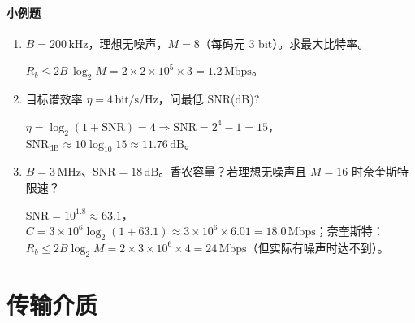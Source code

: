 \documentclass[lang=cn,newtx,10pt,scheme=chinese]{../../elegantbook}
\begin{document}
\paragraph{小例题}
\begin{enumerate}[label=例\arabic*.]
    \item $B=200\,\mathrm{kHz}$，理想无噪声，$M=8$（每码元 3 bit）。求最大比特率。
  
    $R_b\le 2B\,\log_2M=2\times 2\times 10^5\times 3=1.2\,\mathrm{Mbps}$。
  
    \item 目标谱效率 $\eta=4\,\mathrm{bit/s/Hz}$，问最低 SNR(dB)?
  
    $\eta=\log_2(1+\mathrm{SNR})=4\Rightarrow \mathrm{SNR}=2^4-1=15$，$\mathrm{SNR}_{\mathrm{dB}}\approx 10\log_{10}15\approx 11.76\,\mathrm{dB}$。
  
    \item $B=3\,\mathrm{MHz}$、$\mathrm{SNR}=18\,\mathrm{dB}$。香农容量？若理想无噪声且 $M=16$ 时奈奎斯特限速？
  
    $\mathrm{SNR}=10^{1.8}\approx 63.1$，$C=3\times10^6\log_2(1+63.1)\approx 3\times10^6\times 6.01=18.0\,\mathrm{Mbps}$；奈奎斯特：$R_b\le 2B\log_2M=2\times 3\times10^6\times 4=24\,\mathrm{Mbps}$（但实际有噪声时达不到）。
\end{enumerate}
\begin{center}
{\setlength{\fboxsep}{6pt}%
}%
\end{center}

\section{传输介质}
\end{document}
